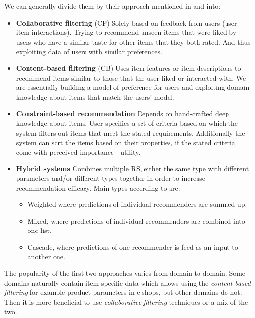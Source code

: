 We can generally divide them by their approach mentioned in \cite{RS_handbook-ricci2011} and \cite{constraint_based_recommenders} into:
\begin{itemize}
    \item \textbf{Collaborative filtering} (CF)\newline
        Solely based on feedback from users (user-item interactions). Trying to recommend unseen items that were liked by users who have a similar taste for other items that they both rated. And thus exploiting data of users with similar preferences.
    \item  \textbf{Content-based filtering} (CB)\newline
        Uses item features or item descriptions to recommend items similar to those that the user liked or interacted with. We are essentially building a model of preference for users and exploiting domain knowledge about items that match the users' model.
    \item \textbf{Constraint-based recommendation}\newline
        Depends on hand-crafted deep knowledge about items. User specifies a set of criteria based on which the system filters out items that meet the stated requirements. Additionally the system can sort the items based on their properties, if the stated criteria come with perceived importance - utility.
    \item \textbf{Hybrid systems}\newline    
        Combines multiple RS, either the same type with different parameters and/or different types together in order to increase recommendation efficacy. Main types according to \cite{grouprecommendersystems_felfernig2018group} are:
        \begin{itemize}
            \item Weighted where predictions of individual recommenders are summed up.
            \item Mixed, where predictions of individual recommenders are combined into one list.
            \item Cascade, where predictions of one recommender is feed as an input to another one.
        \end{itemize}
\end{itemize}

The popularity of the first two approaches varies from domain to domain. Some domains naturally contain item-specific data which allows using the \textit{content-based filtering} for example product parameters in e-shops, but other domains do not. Then it is more beneficial to use \textit{collaborative filtering} techniques or a mix of the two.

